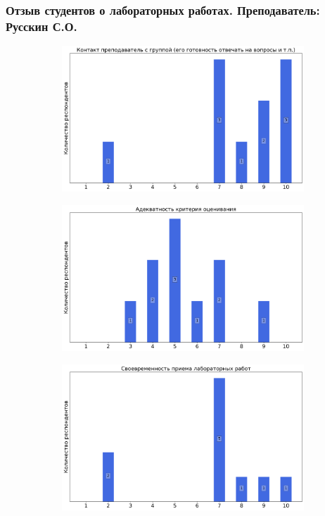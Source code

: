     \subsubsection{Отзыв студентов о лабораторных работах. Преподаватель: Русскин С.О.}
		\begin{figure}[H]
			\centering
			\begin{subfigure}[b]{0.45\textwidth}
				\centering
				\includegraphics[width=\textwidth]{images/3 course/Аналоговая электроника/labniks-marks-Русскин С.О.-0.png}
			\end{subfigure}
			\begin{subfigure}[b]{0.45\textwidth}
				\centering
				\includegraphics[width=\textwidth]{images/3 course/Аналоговая электроника/labniks-marks-Русскин С.О.-1.png}
			\end{subfigure}
			\begin{subfigure}[b]{0.45\textwidth}
				\centering
				\includegraphics[width=\textwidth]{images/3 course/Аналоговая электроника/labniks-marks-Русскин С.О.-2.png}

\end{subfigure}
\end{figure}
